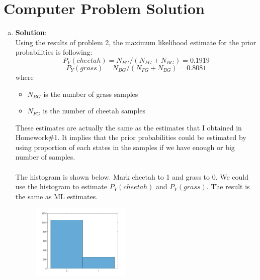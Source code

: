 \documentclass[12pt,letterpaper]{article}
\begin{document}
     
    \section*{Computer Problem Solution}
    \begin{enumerate}[a)]
        \item 
        
        \textbf{Solution}:\\
        Using the results of problem 2, the maximum likelihood estimate for the prior probabilities is following:
        \begin{equation}
            P_Y(cheetah) = N_{FG} / (N_{FG} + N_{BG}) = 0.1919 \nonumber
        \end{equation}
        \begin{equation}
            P_Y(grass) = N_{BG} / (N_{FG} + N_{BG}) = 0.8081 \nonumber
        \end{equation}
        where 
        \begin{itemize}
            \item[] $N_{BG}$ is the number of grass samples
            \item[] $N_{FG}$ is the number of cheetah samples
        \end{itemize}
        These estimates are actually the same as the estimates that I obtained in Homework\#1. It implies that the prior probabilities
        could be estimated by using proportion of each states in the samples if we have enough or big number of samples.\\
        \\
        The histogram is shown below. Mark cheetah to 1 and grass to 0. We could use the histogram to estimate $P_Y(cheetah)$ and $P_Y(grass)$. The result is the same as
        ML estimates.
        \begin{figure}[H]
            \centering 
            \includegraphics[width=0.45\textwidth]{Images/histogram.jpg}
            \label{Fig.histogram}
        \end{figure}


\end{enumerate}
\end{document}
